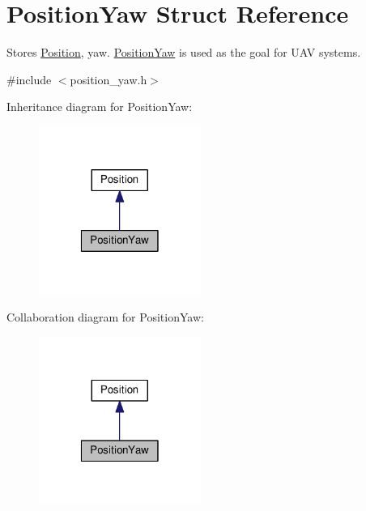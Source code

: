 \hypertarget{structPositionYaw}{\section{Position\-Yaw Struct Reference}
\label{structPositionYaw}
}


Stores \hyperlink{structPosition}{Position}, yaw. \hyperlink{structPositionYaw}{Position\-Yaw} is used as the goal for U\-A\-V systems.  




{\ttfamily \#include $<$position\-\_\-yaw.\-h$>$}



Inheritance diagram for Position\-Yaw\-:\nopagebreak
\begin{figure}[H]
\begin{center}
\leavevmode
\includegraphics[width=150pt]{structPositionYaw__inherit__graph}
\end{center}
\end{figure}


Collaboration diagram for Position\-Yaw\-:\nopagebreak
\begin{figure}[H]
\begin{center}
\leavevmode
\includegraphics[width=150pt]{structPositionYaw__coll__graph}
\end{center}
\end{figure}
